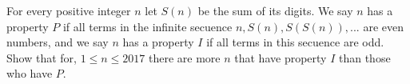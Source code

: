 For every positive integer $n$ let $S(n)$ be the sum of its digits. We say $n$ has a property $P$ if all terms in the infinite secuence $n, S(n), S(S(n)),...$ are even numbers, and we say $n$ has a property $I$ if all terms in this secuence are odd. Show that for, $1 \le n \le 2017$ there are more $n$ that have property $I$ than those who have $P$.
